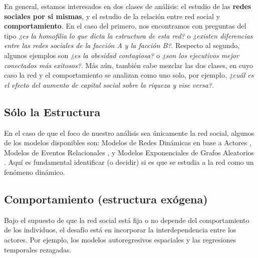 \documentclass[11pt]{article}
\begin{document}
En general, estamos interesados en dos clases de análisis: el estudio de las \textbf{redes sociales por si mismas}, y el estudio de la relación entre red social y \textbf{comportamiento}. En el caso del primero, nos encontramos con preguntas del tipo \textit{¿es la homofilia lo que dicta la estructura de esta red?} o \textit{¿existen diferencias entre las redes sociales de la facción A y la facción B?}. Respecto al segundo, algunos ejemplos son \textit{¿es la obesidad contagiosa?} o \textit{¿son los ejecutivos mejor conectados más exitosos?}. Más aún, también cabe mezclar las dos clases, en cuyo caso la red y el comportamiento se analizan como uno solo, por ejemplo, \textit{¿cuál es el efecto del aumento de capital social sobre la riqueza y vise versa?}.

\subsection{Sólo la Estructura}

En el caso de que el foco de nuestro análisis sea únicamente la red social, algunos de los modelos disponibles son: Modelos de Redes Dinámicas en base a Actores \parencite[\textit{Dynamic Actor Network Models} o DyNAMs, por sus siglas en Inglés,]{Stadtfeld2017}, Modelos de Eventos Relacionales \parencite[\textit{Relational-Event Models} o REM, por sus siglas en inglés,]{Butts2008}, y Modelos Exponenciales de Grafos Aleatorios \parencite[\textit{Exponential Random Graph Models} o ERGMS, por sus siglas en Inglés,][, y muchos otros]{Robins2007,Holland1981,Frank1986,Wasserman1996,Snijders2006}. Aquí es fundamental identificar (o decidir) si es que se estudia a la red como un fenómeno dinámico.

\subsection{Comportamiento (estructura exógena)}

Bajo el supuesto de que la red social está fija o no depende del comportamiento de los individuos, el desafío está en incorporar la interdependencia entre los actores. Por ejemplo, los modelos autoregresivos espaciales \parencite[\textit{Spatial Auto-Regressive} o SAR, por sus siglas en Inglés,][]{LeSage2008,Elhorst2014,fischer2013handbook} y las regresiones temporales rezagadas.
\end{document}
